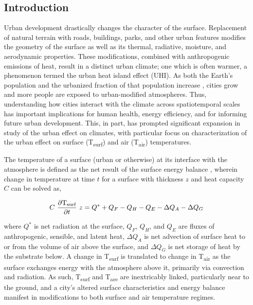 \begin{bibunit}
	
\rhead{\thepage}

\chapter{Introduction}
Urban development drastically changes the character of the surface. Replacement of natural terrain with roads, buildings, parks, and other urban features modifies the geometry of the surface as well as its thermal, radiative, moisture, and aerodynamic properties. These modifications, combined with anthropogenic emissions of heat, result in a distinct urban climate; one which is often warmer, a phenomenon termed the urban heat island effect (UHI). As both the Earth's population and the urbanized fraction of that population increase \citep{Nations2014}, cities grow and more people are exposed to urban-modified atmospheres. Thus, understanding how cities interact with the climate across spatiotemporal scales has important implications for human health, energy efficiency, and for informing future urban development. This, in part, has prompted significant expansion in study of the urban effect on climates, with particular focus on characterization of the urban effect on surface (T\textsubscript{surf}) and air (T\textsubscript{air}) temperatures.

\pagebreak

The temperature of a surface (urban or otherwise) at its interface with the atmosphere is defined as the net result of the surface energy balance \citep{Oke2017}, wherein change in temperature at time $t$ for a surface with thickness $z$ and heat capacity $C$ can be solved as,

\begin{equation}
	C~\frac{\partial \text{T\textsubscript{surf}}}{\partial t}~z = Q^*+ Q_F - Q_H - Q_E - \Delta Q_A - \Delta Q_G
\end{equation}

\noindent where $Q^*$ is net radiation at the surface, $Q_F$, $Q_H$, and $Q_E$ are fluxes of anthropogenic, sensible, and latent heat, $\Delta Q_A$ is net advection of surface heat to or from the volume of air above the surface, and $\Delta Q_G$ is net storage of heat by the substrate below. A change in T\textsubscript{surf} is translated to change in T\textsubscript{air} as the surface exchanges energy with the atmosphere above it, primarily via convection and radiation. As such, T\textsubscript{surf} and T\textsubscript{are} are inextricably linked, particularly near to the ground, and a city's altered surface characteristics and energy balance manifest in modifications to both surface and air temperature regimes.


\end{bibunit}
